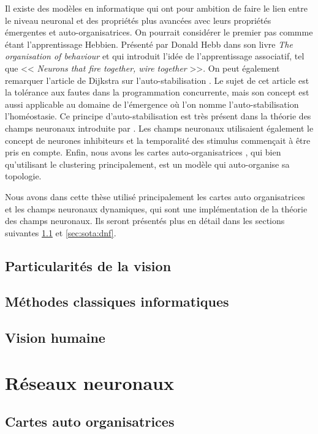 	Il existe des modèles en informatique qui ont pour ambition de faire le lien entre le niveau neuronal et des propriétés plus avancées avec leurs propriétés émergentes et auto-organisatrices. On pourrait considérer le premier pas commme étant l'apprentissage Hebbien. Présenté par Donald Hebb dans son livre \textit{The organisation of behaviour} \cite{hebb1949organisation} et qui introduit l'idée de l'apprentissage associatif, tel que << \textit{Neurons that fire together, wire together} >>. On peut également remarquer l'article de Dijkstra sur l'auto-stabilisation \cite{dijkstra1982self}. Le sujet de cet article est la tolérance aux fautes dans la programmation concurrente, mais son concept est aussi applicable au domaine de l'émergence où l'on nomme l'auto-stabilisation l'homéostasie. Ce principe d'auto-stabilisation est très présent dans la théorie des champs neuronaux introduite par \cite{amari1977dynamics}. Les champs neuronaux utilisaient également le concept de neurones inhibiteurs et la temporalité des stimulus commençait à être pris en compte. Enfin, nous avons les cartes auto-organisatrices \cite{kohonen-som82}, qui bien qu'utilisant le clustering principalement, est un modèle qui auto-organise sa topologie.

	Nous avons dans cette thèse utilisé principalement les cartes auto organisatrices et les champs neuronaux dynamiques, qui sont une implémentation de la théorie des champs neuronaux. Ils seront présentés plus en détail dans les sections suivantes \ref{sec:sota:som} et \ref{sec:sota:dnf}.

\subsection{Particularités de la vision}
\subsection{Méthodes classiques informatiques}
\subsection{Vision humaine}

\newpage
\section{Réseaux neuronaux}
\subsection{Cartes auto organisatrices}\label{sec:sota:som}

